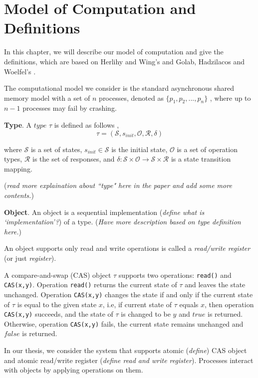 
\chapter{Model of Computation and Definitions}
In this chapter, we will describe our model of computation and give the definitions, which are based on Herlihy
and Wing's \cite{Herlihy:1990:LCC:78969.78972} and Golab, Hadzilacos and Woelfel's \cite{InProc-GHHW2007a}.

The computational model we consider is the standard asynchronous shared memory model with a set of $n$ processes,
denoted as $\{p_1, p_2,...,p_n\}$ , where up to $n-1$ processes may fail by crashing.


\textbf{Type}.
A $type$ $\tau$ is defined as follows \cite{InProc-GHHW2007a},
$$\tau = (\mathcal{S}, s_{init},\mathcal{O},\mathcal{R} ,\delta )$$

where $\mathcal{S}$ is a set of states, $s_{init} \in \mathcal{S}$ is the initial state, $\mathcal{O}$ is a set of
operation types, $\mathcal{R}$ is the set of responses, and
$\delta :\mathcal{S} \times \mathcal{O} \to \mathcal{S} \times \mathcal{R}$ is a state transition mapping.

(\emph{read more explaination about ``type" here in the paper and add some more contents.})




\textbf{Object}.
An object is a sequential implementation (\emph{define what is `implementation'?}) of a type.
(\emph{Have more description based on type definition here.})

An object supports only read and write operations is called a \emph{read/write register} (or just \emph{register}).

A compare-and-swap (CAS) object $\tau$ supports two operations: \texttt{read()} and \texttt{CAS(x,y)}.
Operation \texttt{read()} returns the current state of $\tau$ and leaves the state unchanged. Operation
\texttt{CAS(x,y)} changes the state if and only if the current state of $\tau$ is equal to the given state $x$, i.e,
if current state of $\tau$ equals $x$, then operation \texttt{CAS(x,y)} succeeds, and the state of $\tau$ is changed
to be $y$ and $true$ is returned. Otherwise, operation \texttt{CAS(x,y)} fails, the current state remains unchanged and
$false$ is returned.

In our thesis, we consider the system that supports atomic (\emph{define}) CAS object and atomic read/write register
(\emph{define read and write register}). Processes interact with objects by applying operations on them.



